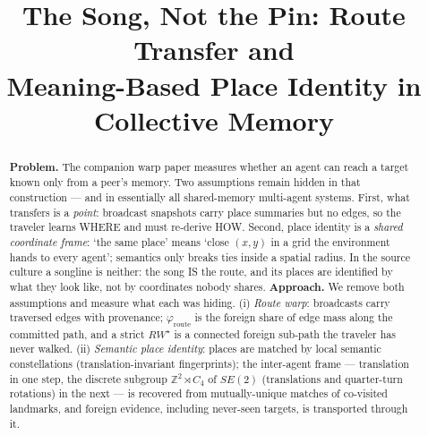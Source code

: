 \documentclass{article}
\title{The Song, Not the Pin: Route Transfer and\\Meaning-Based Place Identity in Collective Memory}
\newcommand{\rwstar}{RW^{\star}}
\newcommand{\phiroute}{\varphi_{\mathrm{route}}}
\begin{document}
\maketitle

\begin{abstract}
\textbf{Problem.} The companion warp paper measures whether an agent can reach a target known only from a peer's memory. Two assumptions remain hidden in that construction --- and in essentially all shared-memory multi-agent systems. First, what transfers is a \emph{point}: broadcast snapshots carry place summaries but no edges, so the traveler learns WHERE and must re-derive HOW. Second, place identity is a \emph{shared coordinate frame}: `the same place' means `close $(x,y)$ in a grid the environment hands to every agent'; semantics only breaks ties inside a spatial radius. In the source culture a songline is neither: the song IS the route, and its places are identified by what they look like, not by coordinates nobody shares.
\textbf{Approach.} We remove both assumptions and measure what each was hiding. (i) \emph{Route warp}: broadcasts carry traversed edges with provenance; $\phiroute$ is the foreign share of edge mass along the committed path, and a strict $\rwstar$ is a connected foreign sub-path the traveler has never walked. (ii) \emph{Semantic place identity}: places are matched by local semantic constellations (translation-invariant fingerprints); the inter-agent frame --- translation in one step, the discrete subgroup $\mathbb{Z}^2\rtimes C_4$ of $SE(2)$ (translations and quarter-turn rotations) in the next --- is recovered from mutually-unique matches of co-visited landmarks, and foreign evidence, including never-seen targets, is transported through it.

\end{abstract}
\end{document}
